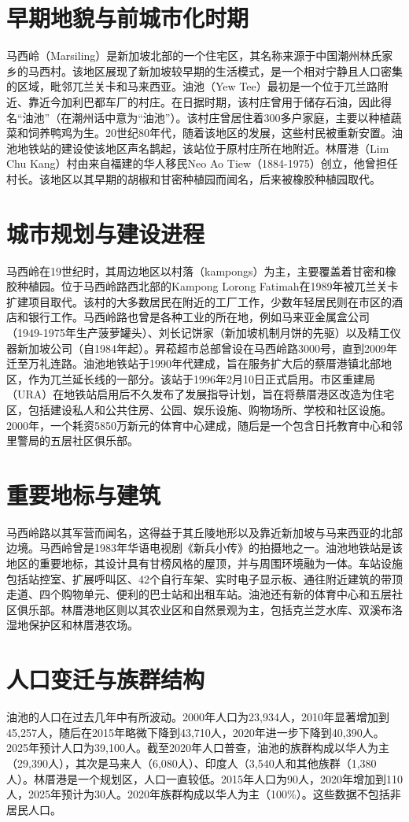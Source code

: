 \documentclass[11pt,a4paper,twoside,openany]{book}
\begin{document}
\section{早期地貌与前城市化时期}
马西岭（Marsiling）是新加坡北部的一个住宅区，其名称来源于中国潮州林氏家乡的马西村。该地区展现了新加坡较早期的生活模式，是一个相对宁静且人口密集的区域，毗邻兀兰关卡和马来西亚。油池（Yew Tee）最初是一个位于兀兰路附近、靠近今加利巴都车厂的村庄。在日据时期，该村庄曾用于储存石油，因此得名“油池”（在潮州话中意为“油池”）。该村庄曾居住着300多户家庭，主要以种植蔬菜和饲养鸭鸡为生。20世纪80年代，随着该地区的发展，这些村民被重新安置。油池地铁站的建设使该地区声名鹊起，该站位于原村庄所在地附近。林厝港（Lim Chu Kang）村由来自福建的华人移民Neo Ao Tiew（1884-1975）创立，他曾担任村长。该地区以其早期的胡椒和甘密种植园而闻名，后来被橡胶种植园取代。

\section{城市规划与建设进程}
马西岭在19世纪时，其周边地区以村落（kampongs）为主，主要覆盖着甘密和橡胶种植园。位于马西岭路西北部的Kampong Lorong Fatimah在1989年被兀兰关卡扩建项目取代。该村的大多数居民在附近的工厂工作，少数年轻居民则在市区的酒店和银行工作。马西岭路也曾是各种工业的所在地，例如马来亚金属盒公司（1949-1975年生产菠萝罐头）、刘长记饼家（新加坡机制月饼的先驱）以及精工仪器新加坡公司（自1984年起）。昇菘超市总部曾设在马西岭路3000号，直到2009年迁至万礼连路。油池地铁站于1990年代建成，旨在服务扩大后的蔡厝港镇北部地区，作为兀兰延长线的一部分。该站于1996年2月10日正式启用。市区重建局（URA）在地铁站启用后不久发布了发展指导计划，旨在将蔡厝港区改造为住宅区，包括建设私人和公共住房、公园、娱乐设施、购物场所、学校和社区设施。2000年，一个耗资5850万新元的体育中心建成，随后是一个包含日托教育中心和邻里警局的五层社区俱乐部。

\section{重要地标与建筑}
马西岭路以其军营而闻名，这得益于其丘陵地形以及靠近新加坡与马来西亚的北部边境。马西岭曾是1983年华语电视剧《新兵小传》的拍摄地之一。油池地铁站是该地区的重要地标，其设计具有甘榜风格的屋顶，并与周围环境融为一体。车站设施包括站控室、扩展呼叫区、42个自行车架、实时电子显示板、通往附近建筑的带顶走道、四个购物单元、便利的巴士站和出租车站。油池还有新的体育中心和五层社区俱乐部。林厝港地区则以其农业区和自然景观为主，包括克兰芝水库、双溪布洛湿地保护区和林厝港农场。

\section{人口变迁与族群结构}
油池的人口在过去几年中有所波动。2000年人口为23,934人，2010年显著增加到45,257人，随后在2015年略微下降到43,710人，2020年进一步下降到40,390人。2025年预计人口为39,100人。截至2020年人口普查，油池的族群构成以华人为主（29,390人），其次是马来人（6,080人）、印度人（3,540人和其他族群（1,380人）。林厝港是一个规划区，人口一直较低。2015年人口为90人，2020年增加到110人，2025年预计为30人。2020年族群构成以华人为主（100\%）。这些数据不包括非居民人口。
\end{document}
